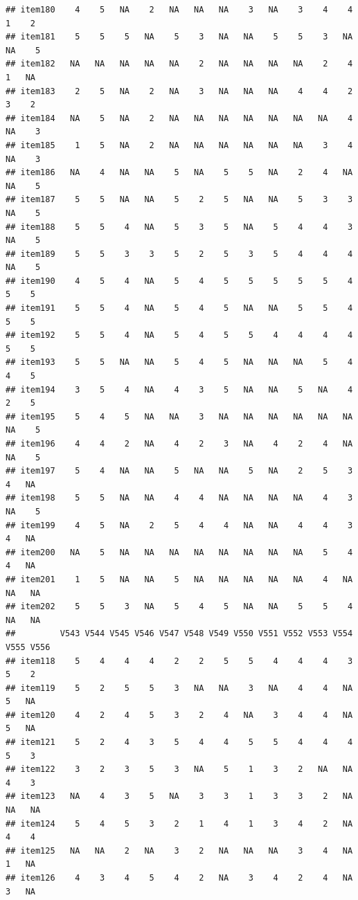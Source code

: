 \documentclass[
  man]{apa6}
\begin{document}
\begin{verbatim}
## item180    4    5   NA    2   NA   NA   NA    3   NA    3    4    4    1    2
## item181    5    5    5   NA    5    3   NA   NA    5    5    3   NA   NA    5
## item182   NA   NA   NA   NA   NA    2   NA   NA   NA   NA    2    4    1   NA
## item183    2    5   NA    2   NA    3   NA   NA   NA    4    4    2    3    2
## item184   NA    5   NA    2   NA   NA   NA   NA   NA   NA   NA    4   NA    3
## item185    1    5   NA    2   NA   NA   NA   NA   NA   NA    3    4   NA    3
## item186   NA    4   NA   NA    5   NA    5    5   NA    2    4   NA   NA    5
## item187    5    5   NA   NA    5    2    5   NA   NA    5    3    3   NA    5
## item188    5    5    4   NA    5    3    5   NA    5    4    4    3   NA    5
## item189    5    5    3    3    5    2    5    3    5    4    4    4   NA    5
## item190    4    5    4   NA    5    4    5    5    5    5    5    4    5    5
## item191    5    5    4   NA    5    4    5   NA   NA    5    5    4    5    5
## item192    5    5    4   NA    5    4    5    5    4    4    4    4    5    5
## item193    5    5   NA   NA    5    4    5   NA   NA   NA    5    4    4    5
## item194    3    5    4   NA    4    3    5   NA   NA    5   NA    4    2    5
## item195    5    4    5   NA   NA    3   NA   NA   NA   NA   NA   NA   NA    5
## item196    4    4    2   NA    4    2    3   NA    4    2    4   NA   NA    5
## item197    5    4   NA   NA    5   NA   NA    5   NA    2    5    3    4   NA
## item198    5    5   NA   NA    4    4   NA   NA   NA   NA    4    3   NA    5
## item199    4    5   NA    2    5    4    4   NA   NA    4    4    3    4   NA
## item200   NA    5   NA   NA   NA   NA   NA   NA   NA   NA    5    4    4   NA
## item201    1    5   NA   NA    5   NA   NA   NA   NA   NA    4   NA   NA   NA
## item202    5    5    3   NA    5    4    5   NA   NA    5    5    4   NA   NA
##         V543 V544 V545 V546 V547 V548 V549 V550 V551 V552 V553 V554 V555 V556
## item118    5    4    4    4    2    2    5    5    4    4    4    3    5    2
## item119    5    2    5    5    3   NA   NA    3   NA    4    4   NA    5   NA
## item120    4    2    4    5    3    2    4   NA    3    4    4   NA    5   NA
## item121    5    2    4    3    5    4    4    5    5    4    4    4    5    3
## item122    3    2    3    5    3   NA    5    1    3    2   NA   NA    4    3
## item123   NA    4    3    5   NA    3    3    1    3    3    2   NA   NA   NA
## item124    5    4    5    3    2    1    4    1    3    4    2   NA    4    4
## item125   NA   NA    2   NA    3    2   NA   NA   NA    3    4   NA    1   NA
## item126    4    3    4    5    4    2   NA    3    4    2    4   NA    3   NA

\end{verbatim}
\end{document}
